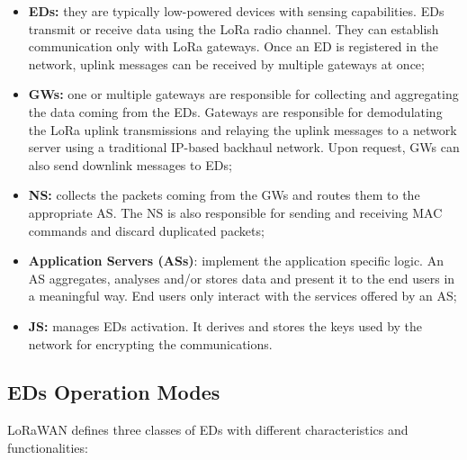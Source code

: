 \begin{itemize}
	\item \textbf{\glspl{ED}:} they are typically low-powered devices with sensing capabilities. \glspl{ED} transmit or receive data using the LoRa radio channel. They can establish communication only with LoRa gateways.
Once an \gls{ED} is registered in the network, uplink messages can be received by multiple gateways at once;

	\item \textbf{\glspl{GW}:} one or multiple gateways are responsible for collecting and aggregating the data coming from the \glspl{ED}. Gateways are responsible for demodulating the LoRa uplink transmissions and relaying the uplink messages to a network server using a traditional IP-based backhaul network. Upon request, \glspl{GW} can also send downlink messages to \glspl{ED};
	
	\item \textbf{\gls{NS}:} collects the packets coming from the \glspl{GW} and routes them to the appropriate \gls{AS}. The \gls{NS} is also responsible for sending and receiving MAC commands and discard duplicated packets;
	
    \item \textbf{Application Servers (ASs)}: implement the application specific logic. An \gls{AS} aggregates, analyses and/or stores data and present it to the end users in a meaningful way. End users only interact with the services offered by an \gls{AS};
    
    \item \textbf{\gls{JS}:} manages \glspl{ED} activation. It derives and stores the keys used by the network for encrypting the communications.
        
\end{itemize}

\subsection{\glspl{ED} Operation Modes}

LoRaWAN defines three classes of \glspl{ED} with different characteristics and functionalities:

